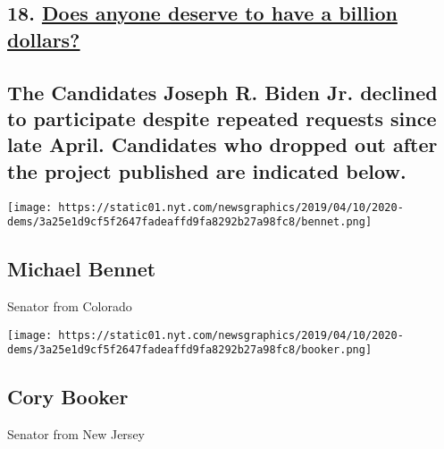 \hypertarget{18-does-anyone-deserve-to-have-a-billion-dollars}{%
\subsection{\texorpdfstring{18.
\href{https://www.nytimes.com/interactive/2019/us/politics/billionaires-democratic-candidates.html}{Does
anyone deserve to have a billion
dollars?}}{18. Does anyone deserve to have a billion dollars?}}\label{18-does-anyone-deserve-to-have-a-billion-dollars}}

\hypertarget{the-candidates-joseph-r-biden-jr-declined-to-participate-despite-repeated-requests-since-late-april-candidates-who-dropped-out-after-the-project-published-are-indicated-below-}{%
\subsection{The Candidates Joseph R. Biden Jr. declined to participate
despite repeated requests since late April. Candidates who dropped out
after the project published are indicated below.
}\label{the-candidates-joseph-r-biden-jr-declined-to-participate-despite-repeated-requests-since-late-april-candidates-who-dropped-out-after-the-project-published-are-indicated-below-}}

\href{https://www.nytimes.com/interactive/2019/us/politics/michael-bennet-2020-campaign.html}{}

\texttt{[image: https://static01.nyt.com/newsgraphics/2019/04/10/2020-dems/3a25e1d9cf5f2647fadeaffd9fa8292b27a98fc8/bennet.png]}

\hypertarget{michael-bennet}{%
\subsection{Michael Bennet}\label{michael-bennet}}

Senator from Colorado

\href{https://www.nytimes.com/interactive/2019/us/politics/cory-booker-2020-campaign.html}{}

\texttt{[image: https://static01.nyt.com/newsgraphics/2019/04/10/2020-dems/3a25e1d9cf5f2647fadeaffd9fa8292b27a98fc8/booker.png]}

\hypertarget{cory-booker}{%
\subsection{Cory Booker}\label{cory-booker}}

Senator from New Jersey

